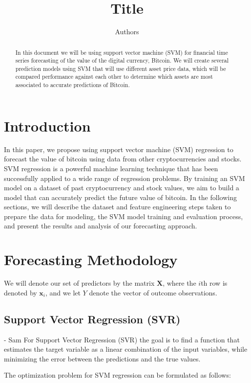 \documentclass[11pt]{article}
\title{\vspace{-2cm}Title}
\author{Authors}
\date{\vspace{-5ex}}
\theoremstyle{definition}
\newcommand{\bx}{\mathbf{x}}
\newcommand{\bX}{\mathbf{X}}
\begin{document}
 
\maketitle

\begin{abstract}
In this document we will be using support vector machine (SVM) for financial time series forecasting of the value of the digital currency, Bitcoin. We will create several prediction models using SVM that will use different asset price data, which will be compared performance against each other to determine which assets are most associated to accurate predictions of Bitcoin.  

\end{abstract}

\section{Introduction}
In this paper, we propose using support vector machine (SVM) regression to forecast the value of bitcoin using data from other cryptocurrencies and stocks. SVM regression is a powerful machine learning technique that has been successfully applied to a wide range of regression problems. By training an SVM model on a dataset of past cryptocurrency and stock values, we aim to build a model that can accurately predict the future value of bitcoin. In the following sections, we will describe the dataset and feature engineering steps taken to prepare the data for modeling, the SVM model training and evaluation process, and present the results and analysis of our forecasting approach.

\section{Forecasting Methodology}
We will denote our set of predictors by the matrix $\bX$, where the $i$th row is denoted by $\bx_i$, and we let $Y$ denote the vector of outcome observations. 


\subsection{Support Vector Regression (SVR)}
- Sam
For Support Vector Regression (SVR) the goal is to find a function that estimates the target variable as a linear combination of the input variables, while minimizing the error between the predictions and the true values.

The optimization problem for SVM regression can be formulated as follows:
\end{document}
